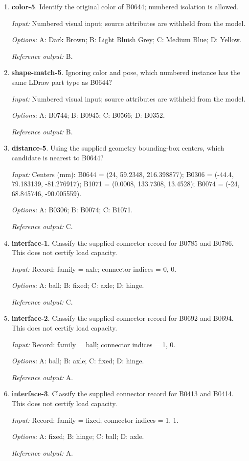 \begin{enumerate}
\item \textbf{color-5}. Identify the original color of B0644; numbered isolation is allowed.\par {\small \textit{Input:} Numbered visual input; source attributes are withheld from the model. \par\textit{Options:} A: Dark Brown; B: Light Bluish Grey; C: Medium Blue; D: Yellow. \par\textit{Reference output:} B.}
\item \textbf{shape-match-5}. Ignoring color and pose, which numbered instance has the same LDraw part type as B0644?\par {\small \textit{Input:} Numbered visual input; source attributes are withheld from the model. \par\textit{Options:} A: B0744; B: B0945; C: B0566; D: B0352. \par\textit{Reference output:} B.}
\item \textbf{distance-5}. Using the supplied geometry bounding-box centers, which candidate is nearest to B0644?\par {\small \textit{Input:} Centers (mm): B0644 = (24, 59.2348, 216.398877); B0306 = (-44.4, 79.183139, -81.276917); B1071 = (0.0008, 133.7308, 13.4528); B0074 = (-24, 68.845746, -90.005559). \par\textit{Options:} A: B0306; B: B0074; C: B1071. \par\textit{Reference output:} C.}
\item \textbf{interface-1}. Classify the supplied connector record for B0785 and B0786. This does not certify load capacity.\par {\small \textit{Input:} Record: family = axle; connector indices = 0, 0. \par\textit{Options:} A: ball; B: fixed; C: axle; D: hinge. \par\textit{Reference output:} C.}
\item \textbf{interface-2}. Classify the supplied connector record for B0692 and B0694. This does not certify load capacity.\par {\small \textit{Input:} Record: family = ball; connector indices = 1, 0. \par\textit{Options:} A: ball; B: axle; C: fixed; D: hinge. \par\textit{Reference output:} A.}
\item \textbf{interface-3}. Classify the supplied connector record for B0413 and B0414. This does not certify load capacity.\par {\small \textit{Input:} Record: family = fixed; connector indices = 1, 1. \par\textit{Options:} A: fixed; B: hinge; C: ball; D: axle. \par\textit{Reference output:} A.}

\end{enumerate}
